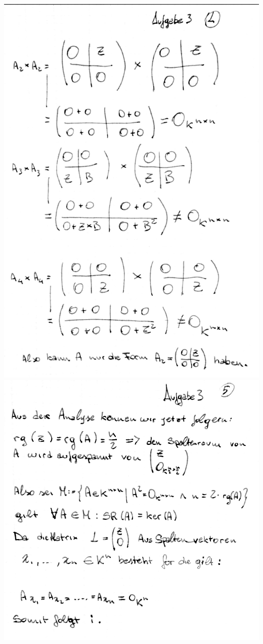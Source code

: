 \documentclass[10pt,a4paper]{article}
\begin{document}
\includegraphics[scale=0.25]{lat1_8.jpg}  \\
\includegraphics[scale=0.25]{lat1_9.jpg}  \\
\end{document}
